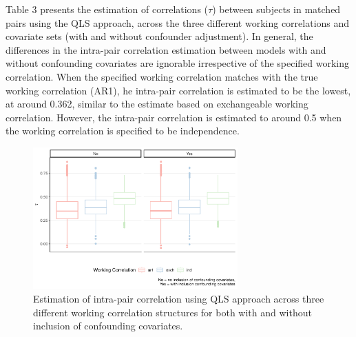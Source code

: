 \documentclass[
]{aft}
\begin{document}
Table 3 presents the estimation of correlations (\(\tau\)) between
subjects in matched pairs using the QLS approach, across the three
different working correlations and covariate sets (with and without
confounder adjustment). In general, the differences in the intra-pair
correlation estimation between models with and without confounding
covariates are ignorable irrespective of the specified working
correlation. When the specified working correlation matches with the
true working correlation (AR1), he intra-pair correlation is estimated
to be the lowest, at around 0.362, similar to the estimate based on
exchangeable working correlation. However, the intra-pair correlation is
estimated to around 0.5 when the working correlation is specified to be
independence.

\begin{table}[H]
\centering\centering
\caption{\footnotesize Estimation of correlations between subjects in matched pairs using QLS approach.}
\centering
{}
\end{table}

\begin{figure}[H]

{\centering \includegraphics[width=0.7\textwidth,height=\textheight]{FinalReport_files/figure-pdf/unnamed-chunk-12-1.pdf}

}

\caption{Estimation of intra-pair correlation using QLS approach across
three different working correlation structures for both with and without
inclusion of confounding covariates.}

\end{figure}%
\end{document}
